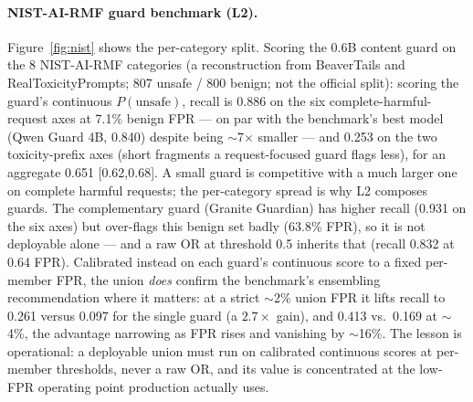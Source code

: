 \documentclass[11pt]{article}
\begin{document}
\paragraph{NIST-AI-RMF guard benchmark (L2).} Figure~\ref{fig:nist} shows the per-category split. Scoring the 0.6B content guard on the 8 NIST-AI-RMF
categories \citep{guard-bench} (a reconstruction from BeaverTails and RealToxicityPrompts;
807 unsafe / 800 benign; not the official split): scoring the guard's continuous $P(\text{unsafe})$,
recall is 0.886 on the six complete-harmful-request axes at 7.1\% benign FPR --- on par with the
benchmark's best model (Qwen Guard 4B, 0.840) despite being $\sim$7$\times$ smaller --- and 0.253 on
the two toxicity-prefix axes (short fragments a request-focused guard flags less), for an aggregate
0.651 [0.62,0.68]. A small guard is competitive with a much larger one on complete harmful requests;
the per-category spread is why L2 composes guards. The complementary guard (Granite Guardian) has
higher recall (0.931 on the six axes) but over-flags this benign set badly (63.8\% FPR), so it is not
deployable alone --- and a raw OR at threshold 0.5 inherits that (recall 0.832 at 0.64 FPR). Calibrated
instead on each guard's continuous score to a fixed per-member FPR, the union \emph{does} confirm the
benchmark's ensembling recommendation where it matters: at a strict $\sim$2\% union FPR it lifts recall
to 0.261 versus 0.097 for the single guard (a $2.7\times$ gain), and 0.413 vs.\ 0.169 at $\sim$4\%,
the advantage narrowing as FPR rises and vanishing by $\sim$16\%. The lesson is operational: a
deployable union must run on calibrated continuous scores at per-member thresholds, never a raw OR, and
its value is concentrated at the low-FPR operating point production actually uses.
\end{document}
